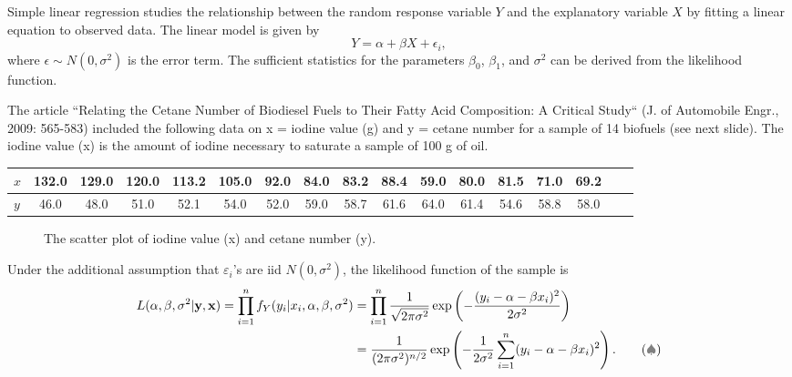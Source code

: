 \begin{example}
    Simple linear regression studies the relationship between the random response variable $Y$ 
    and the explanatory variable $X$ by fitting a linear equation to observed data. The linear model is given by
    \[
        Y = \alpha + \beta X + \epsilon_i,
    \]
    where $\epsilon \sim N(0, \sigma^2)$ is the error term. The sufficient statistics for the parameters $\beta_0$, $\beta_1$, and $\sigma^2$ can be derived from the likelihood function.

    The article ``Relating the Cetane Number of Biodiesel
 Fuels to Their Fatty Acid Composition: A Critical Study``
 (J. of Automobile Engr., 2009: 565-583) included the 
following data on x = iodine value (g) and y = cetane
 number for a sample of 14 biofuels (see next slide).
The iodine value (x) is the amount of iodine necessary to 
saturate a sample of 100 g of oil.

\begin{table}[h!]
    \centering
    \small
    \begin{tabular}{l|cccccccccccccccc}
    \hline
    $x$ & 132.0 & 129.0 & 120.0 & 113.2 & 105.0 & 92.0 & 84.0 & 83.2 & 88.4 & 59.0 & 80.0 & 81.5 & 71.0 & 69.2\\
    \hline
    $y$ & 46.0 & 48.0 & 51.0 & 52.1 & 54.0 & 52.0 & 59.0 & 58.7 & 61.6 & 64.0 & 61.4 & 54.6 & 58.8 & 58.0\\
    \hline
    \end{tabular}
\end{table}

\begin{figure}[ht]
    \centering
    \caption{The scatter plot of iodine value (x) and cetane number (y).}
\end{figure}

Under the additional assumption that $\varepsilon_i$'s are iid $N(0, \sigma^2)$, the likelihood function of the sample is
\begin{align*}
    L(\alpha, \beta, \sigma^2 | \mathbf{y}, \mathbf{x}) = \prod_{i=1}^n f_Y(y_i | x_i, \alpha, \beta, \sigma^2) &= \prod_{i=1}^n \frac{1}{\sqrt{2\pi\sigma^2}} \exp\left(-\frac{(y_i - \alpha - \beta x_i)^2}{2\sigma^2}\right)\\
    &= \frac{1}{(2\pi\sigma^2)^{n/2}} \exp\left(-\frac{1}{2\sigma^2} \sum_{i=1}^n (y_i - \alpha - \beta x_i)^2\right). \label{eq:s2.1} \tag{{\color{gray} $\spadesuit $}} 
\end{align*}


\end{example}
